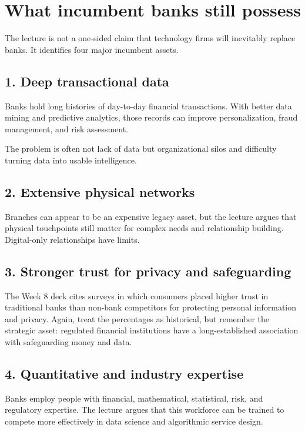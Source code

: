 \section{What incumbent banks still possess}

The lecture is not a one-sided claim that technology firms will inevitably replace banks. It identifies four major incumbent assets.

\subsection{1. Deep transactional data}

Banks hold long histories of day-to-day financial transactions. With better data mining and predictive analytics, those records can improve personalization, fraud management, and risk assessment.

The problem is often not lack of data but organizational silos and difficulty turning data into usable intelligence.

\subsection{2. Extensive physical networks}

Branches can appear to be an expensive legacy asset, but the lecture argues that physical touchpoints still matter for complex needs and relationship building. Digital-only relationships have limits.

\subsection{3. Stronger trust for privacy and safeguarding}

The Week 8 deck cites surveys in which consumers placed higher trust in traditional banks than non-bank competitors for protecting personal information and privacy. Again, treat the percentages as historical, but remember the strategic asset: regulated financial institutions have a long-established association with safeguarding money and data.

\subsection{4. Quantitative and industry expertise}

Banks employ people with financial, mathematical, statistical, risk, and regulatory expertise. The lecture argues that this workforce can be trained to compete more effectively in data science and algorithmic service design.

